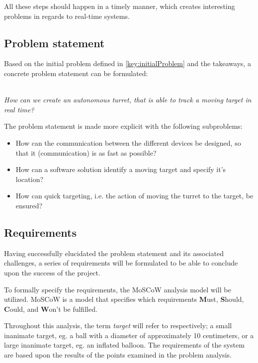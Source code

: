 All these steps should happen in a timely manner, which creates interesting problems in regards to real-time systems.

\subsection{Problem statement}
Based on the initial problem defined in \autoref{key:initialProblem} and the takeaways, a concrete problem statement can be formulated:\\~\\

\begin{center}
	\textit{\large{How can we create an autonomous turret, that is able to track a moving target in real time?}}
\end{center}

The problem statement is made more explicit with the following subproblems:
\begin{center}
	\begin{itemize}
		\item How can the communication between the different devices be designed, so that it (communication) is as fast as possible?
		\item How can a software solution identify a moving target and specify it's location?
		\item How can quick targeting, i.e. the action of moving the turret to the target, be ensured?
	\end{itemize}
\end{center}


\subsection{Requirements}\label{subsec:requirements}
Having successfully elucidated the problem statement and its associated challenges, a series of requirements will be formulated to be able to conclude upon the success of the project.

To formally specify the requirements, the MoSCoW analysis model will be utilized.
MoSCoW is a model that specifies which requirements \textbf{M}ust, \textbf{S}hould, \textbf{C}ould, and \textbf{W}on't be fulfilled.

Throughout this analysis, the term \textit{target} will refer to respectively; a small inanimate target, eg{.} a ball with a diameter of approximately 10 centimeters, or a large inanimate target, eg{.} an inflated balloon.
The requirements of the system are based upon the results of the points examined in the problem analysis.

